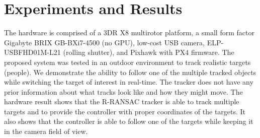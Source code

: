\section{Experiments and Results}
The hardware is comprised of a 3DR X8 multirotor platform, a small form factor Gigabyte BRIX GB-BXi7-4500 (no GPU), low-cost USB camera, ELP-USBFHD01M-L21 (rolling shutter), and Pixhawk with PX4 firmware. The proposed system was tested in an outdoor environment to track realistic targets (people). We demonstrate the ability to follow one of the multiple tracked objects while switching the target of interest in real-time. The tracker does not have any prior information about what tracks look like and how they might move. The hardware result shows that the R-RANSAC tracker is able to track multiple targets and to provide the controller with proper coordinates of the targets. It also shows that the controller is able to follow one of the targets while keeping it in the camera field of view.
